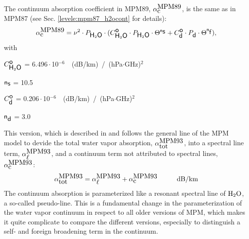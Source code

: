 {
\label{levele:mpm89_h2ocont}
The continuum absorption coefficient in MPM89, $\alpha^{\mbox{\rm MPM89}}_{\mbox{c}}$, 
is the same as in MPM87 (see Sec. \ref{levele:mpm87_h2ocont} for 
details):
\begin{equation} 
  \label{eq:mpm89:cont}
  \alpha^{\mbox{\rm MPM89}}_{\mbox{c}} = \nu^2 \cdot P_{\mbox{\sf H}_{2}\mbox{\sf O}} \cdot 
                (C^{\mbox{\sf o}}_{\mbox{\sf H}_{2}\mbox{\sf O}} \cdot P_{\mbox{\sf H}_{2}\mbox{\sf O}} \cdot \Theta^{{\sf n}_{\mbox{\sf s}}} + 
                 C^{\mbox{\sf o}}_{\mbox{\sf d}} \cdot P_{\mbox{\sf d}}  \cdot \Theta^{{\sf n}_{\mbox{\sf f}}}),
\end{equation}
with
\begin{description}
\item{$C^{\mbox{\sf o}}_{\mbox{\sf H}_{2}\mbox{\sf O}}$}   =  6.496\,$\cdot$\,10$^{-6}$~~(dB/km)~/~(hPa$\cdot$GHz)$^2$
\item{${\sf n}_{\mbox{\sf s}}$}    = 10.5
\item{$C^{\mbox{\sf o}}_{\mbox{\sf d}}$}   =  0.206\,$\cdot$\,10$^{-6}$~~(dB/km)~/~(hPa$\cdot$GHz)$^2$
\item{${\sf n}_{\mbox{\sf d}}$}    =  3.0
\end{description}





\label{leveld:mpm93}
This version, which is described in \cite{liebeandlayton:87} and 
follows the general line of the MPM model to devide the total 
water vapor absorption, $\alpha^{\mbox{\rm MPM93}}_{\mbox{tot}}$, into a spectral line 
term, $\alpha^{\mbox{\rm MPM93}}_{\mbox{$\ell$}}$, and a continuum term not attributed to 
spectral lines, $\alpha^{\mbox{\rm MPM93}}_{\mbox{c}}$:
\begin{equation}
  \label{eq:mpm93_abs}
  \alphampmntot = \alphampmnl + \alphampmnc\hspace*{10mm}\mbox{dB/km}
\end{equation}
The continuum absorption is parameterized like a
resonant spectral line of $\mbox{H}_2\mbox{O}$, a so-called pseudo-line. This is a 
fundamental change in the parameterization of the water vapor
continuum in respect to all older versions of MPM, which makes it 
quite complicate to compare the different versions, especially to 
distinguish a self- and foreign broadening term in the continuum.



}
